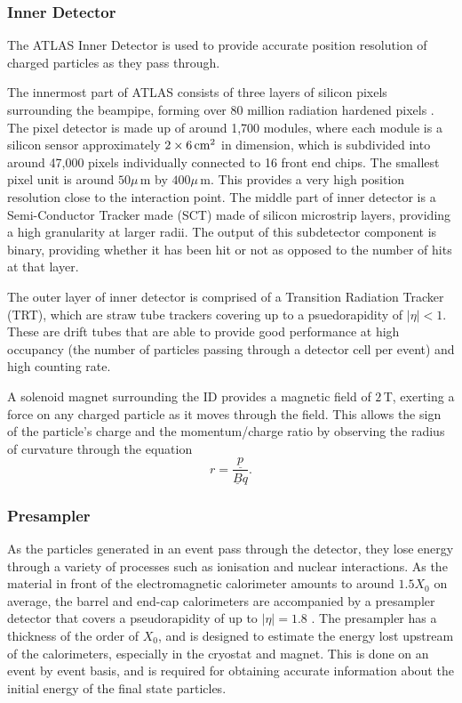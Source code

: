 \documentclass{article}
\begin{document}
\subsubsection{Inner Detector}
\label{sec:ATLAS_DetectorSchematics_ID}
The ATLAS Inner Detector is used to provide accurate position resolution of charged particles as they pass through. 

The innermost part of ATLAS consists of three layers of silicon pixels surrounding the beampipe, forming over 80 million radiation hardened pixels \cite{ATLASPixelDetector}. The pixel detector is made up of around 1,700 modules, where each module is a silicon sensor approximately $2\times6\,\rm{cm}^2$ in dimension, which is subdivided into around 47,000 pixels individually connected to 16 front end chips. The smallest pixel unit is around $50\mu\,$m by $400\mu\,$m. This provides a very high position resolution close to the interaction point. 
The middle part of inner detector is a Semi-Conductor Tracker made (SCT) made of silicon microstrip layers\cite{ATLASReview},  providing a high granularity at larger radii. The output of this subdetector component is binary, providing whether it has been hit or not as opposed to the number of hits at that layer.

The outer layer of inner detector is comprised of a Transition Radiation Tracker (TRT), which are straw tube trackers covering up to a psuedorapidity of $|\eta|<1$. These are drift tubes that are able to provide good performance at high occupancy (the number of particles passing through a detector cell per event) and high counting rate. 

A solenoid magnet surrounding the ID provides a magnetic field of $2\,$T, exerting a force on any charged particle as it moves through the field. This allows the sign of the particle's charge and the momentum/charge ratio by observing the radius of curvature through the equation 
\begin{equation} 
r = \frac{\underline{p}}{\underline{B}q}. 
\end{equation}

\subsubsection{Presampler}
\label{sec:ATLAS_DetectorSchematics_Presampler}

As the particles generated in an event pass through the detector, they lose energy through a variety of processes such as ionisation and nuclear interactions.
As the material in front of the electromagnetic calorimeter amounts to around $1.5X_0$ on average, the barrel and end-cap calorimeters are accompanied by a presampler detector that covers a pseudorapidity of up to $|\eta| = 1.8$ \cite{EMCParticleIdentification}. The presampler has a thickness of the order of $X_0$, and is designed to estimate the energy lost upstream of the calorimeters, especially in the cryostat and magnet. This is done on an event by event basis, and is required for obtaining accurate information about the initial energy of the final state particles.
\end{document}
